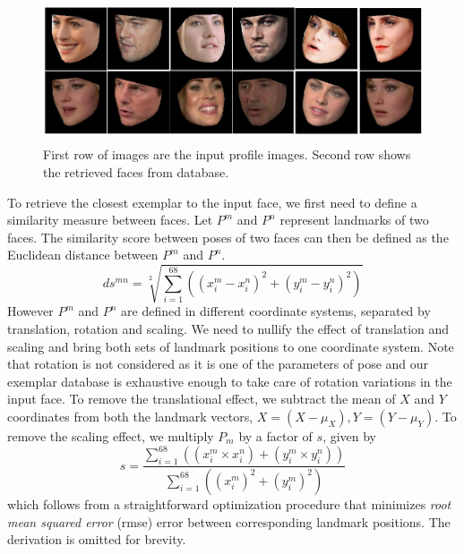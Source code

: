 \begin{figure}
\centering
\includegraphics[width =12cm,height=4.2cm]{front/figures/test_exemplar_map.png}
\caption{First row of images are the input profile images. Second row shows the retrieved faces from database.}
\label{fig:test_exemplar_map}
\end{figure}

To retrieve the closest exemplar to the input face, we first need to define a similarity measure between
faces. Let $P^m$ and $P^n$ represent landmarks of two faces. The similarity score between poses of
two faces can then be defined as the Euclidean distance between $P^m$ and $P^n$.
\begin{equation}
    ds^{mn} = \sqrt[2]{\sum_{i=1}^{68}((x_i^m - x_i^n)^2+(y_i^m - y_i^n)^2)} \label{eq:dissimilarity_score}
\end{equation}
However $P^m$ and $P^n$ are defined in different coordinate systems, separated by translation,
rotation and scaling. We need to nullify the effect
of translation and scaling and bring both sets of landmark positions to one coordinate system. 
Note that rotation is not considered as it is one of the parameters of pose and our exemplar database is
exhaustive enough to take care of rotation variations in the input face.
To remove the translational effect, we subtract the mean of $X$ and $Y$ coordinates from both the landmark vectors,
  $X = (X - \mu_X), Y = (Y - \mu_Y)$.
To remove the scaling effect, we multiply $P_m$ by a factor of $s$, given by
\begin{equation}
  s = \frac{\sum_{i=1}^{68}((x_{i}^{m} \times x_{i}^{n})+(y_{i}^{m} \times y_{i}^{n})) }{\sum_{i=1}^{68}((x_{i}^m)^2 + (y_{i}^{m})^2)}  \label{eq:scaling_effect}
\end{equation}
which follows from a straightforward optimization procedure that minimizes \emph{root mean squared
error} (rmse) error between corresponding landmark positions. The derivation is omitted for brevity.

